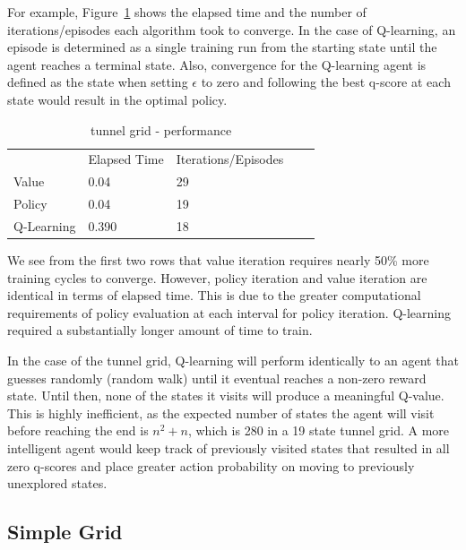 \documentclass{sig-alternate}
\begin{document}
For example, Figure~\ref{tunnel-performance} shows the elapsed time and the number of iterations/episodes each algorithm took to converge. In the case of Q-learning, an episode is determined as a single training run from the starting state until the agent reaches a terminal state. Also, convergence for the Q-learning agent is defined as the state when setting $\epsilon$ to zero and following the best q-score at each state would result in the optimal policy.



\begin{table}[!htbp]
\begin{tabular}{lllll}
           & Elapsed Time & Iterations/Episodes &  &  \\
Value      & 0.04         & 29                  &  &  \\
Policy     & 0.04         & 19                  &  &  \\
Q-Learning & 0.390        & 18                  &  & 
\end{tabular}
\caption{tunnel grid - performance\label{tunnel-performance}}
\end{table}

We see from the first two rows that value iteration requires nearly 50\% more training cycles to converge. However, policy iteration and value iteration are identical in terms of elapsed time. This is due to the greater computational requirements of policy evaluation at each interval for policy iteration. Q-learning required a substantially longer amount of time to train.

In the case of the tunnel grid, Q-learning will perform identically to an agent that guesses randomly (random walk) until it eventual reaches a non-zero reward state. Until then, none of the states it visits will produce a meaningful Q-value. This is highly inefficient, as the expected number of states the agent will visit before reaching the end is $n^2 + n$, which is 280 in a 19 state tunnel grid. A more intelligent agent would keep track of previously visited states that resulted in all zero q-scores and place greater action probability on moving to previously unexplored states.




\subsection{Simple Grid}
\end{document}
